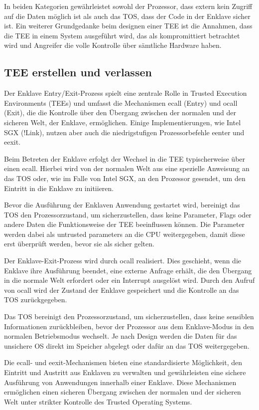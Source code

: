 In beiden Kategorien gewährleistet sowohl der Prozessor, dass extern kein Zugriff auf die Daten möglich ist als auch das TOS, dass der Code in der Enklave sicher ist. Ein weiterer Grundgedanke beim designen einer TEE ist die Annahmen, dass die TEE in einem System ausgeführt wird, das als kompromittiert betrachtet wird und Angreifer die volle Kontrolle über sämtliche Hardware haben.

\subsection{TEE erstellen und verlassen}

Der Enklave Entry/Exit-Prozess spielt eine zentrale Rolle in Trusted Execution Environments (TEEs) und umfasst die Mechanismen ecall (Entry) und ocall (Exit), die die Kontrolle über den Übergang zwischen der normalen und der sicheren Welt, der Enklave, ermöglichen. Einige Implementierungen, wie Intel SGX (!Link), nutzen aber auch die niedrigstufigen Prozessorbefehle eenter und eexit.

Beim Betreten der Enklave erfolgt der Wechsel in die TEE typischerweise über einen ecall. Hierbei wird von der normalen Welt aus eine spezielle Anweisung an das TOS oder, wie im Falle von Intel SGX, an den Prozessor gesendet, um den Eintritt in die Enklave zu initiieren. 

Bevor die Ausführung der Enklaven Anwendung gestartet wird, bereinigt das TOS den Prozessorzustand, um sicherzustellen, dass keine Parameter, Flags oder andere Daten die Funktionsweise der TEE beeinflussen können. Die Parameter werden dabei als untrusted parameters an die CPU weitergegeben, damit diese erst überprüft werden, bevor sie als sicher gelten.

Der Enklave-Exit-Prozess wird durch ocall realisiert. Dies geschieht, wenn die Enklave ihre Ausführung beendet, eine externe Anfrage erhält, die den Übergang in die normale Welt erfordert oder ein Interrupt ausgelöst wird. Durch den Aufruf von ocall wird der Zustand der Enklave gespeichert und die Kontrolle an das TOS zurückgegeben. 

Das TOS bereinigt den Prozessorzustand, um sicherzustellen, dass keine sensiblen Informationen zurückbleiben, bevor der Prozessor aus dem Enklave-Modus in den normalen Betriebsmodus wechselt. Je nach Design werden die Daten für das unsichere OS direkt im Speicher abgelegt oder dafür an das TOS weitergegeben.

Die ecall- und eexit-Mechanismen bieten eine standardisierte Möglichkeit, den Eintritt und Austritt aus Enklaven zu verwalten und gewährleisten eine sichere Ausführung von Anwendungen innerhalb einer Enklave. Diese Mechanismen ermöglichen einen sicheren Übergang zwischen der normalen und der sicheren Welt unter strikter Kontrolle des Trusted Operating Systems.

